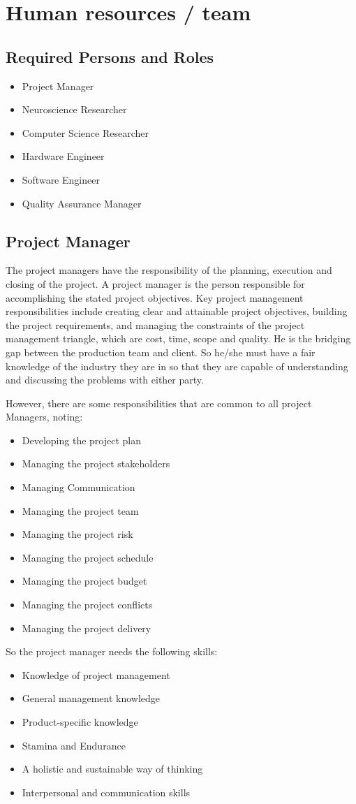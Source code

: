 \section{Human resources / team}
\label{sect:team}
\subsection{Required Persons and Roles}
\begin{itemize}
\item Project Manager
\item Neuroscience Researcher
\item Computer Science Researcher
\item Hardware Engineer
\item Software Engineer
\item Quality Assurance Manager
\end{itemize}

\subsection{Project Manager}
The project managers have the responsibility of the planning, execution and closing of the project. A project manager is the person responsible for accomplishing the stated project objectives. Key project management responsibilities include creating clear and attainable project objectives, building the project requirements, and managing the constraints of the project management triangle, which are cost, time, scope and quality. He is the bridging gap between the production team and client. So he/she must have a fair knowledge of the industry they are in so that they are capable of understanding and discussing the problems with either party.

However, there are some responsibilities that are common to all project Managers, noting:
\begin{itemize}
\item Developing the project plan
\item Managing the project stakeholders
\item Managing Communication
\item Managing the project team
\item Managing the project risk
\item Managing the project schedule
\item Managing the project budget
\item Managing the project conflicts
\item Managing the project delivery
\end{itemize}
So the project manager needs the following skills:
\begin{itemize}
\item Knowledge of project management
\item General management knowledge
\item Product-specific knowledge
\item Stamina and Endurance
\item A holistic and sustainable way of thinking
\item Interpersonal and communication skills
\end{itemize}

